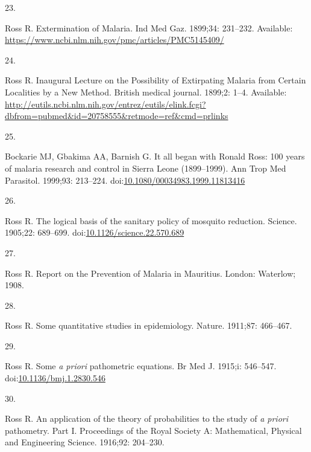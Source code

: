 \documentclass[
]{book}
\newlength{\cslhangindent}
\newlength{\csllabelwidth}
\newlength{\cslentryspacingunit} %
\newenvironment{CSLReferences}[2] %
 {%
  \setlength{\parindent}{0pt}
  \ifodd #1
  \let\oldpar\par
  \def\par{\hangindent=\cslhangindent\oldpar}
  \fi
  \setlength{\parskip}{#2\cslentryspacingunit}
 }%
 {}
\newcommand{\CSLLeftMargin}[1]{\parbox[t]{\csllabelwidth}{#1}}
\newcommand{\CSLRightInline}[1]{\parbox[t]{\linewidth - \csllabelwidth}{#1}\break}
\begin{document}
\begin{CSLReferences}{0}{0}
\leavevmode{}%
\CSLLeftMargin{23. }%
\CSLRightInline{Ross R. Extermination of {Malaria}. Ind Med Gaz. 1899;34: 231--232. Available: \url{https://www.ncbi.nlm.nih.gov/pmc/articles/PMC5145409/}}

\leavevmode{}%
\CSLLeftMargin{24. }%
\CSLRightInline{Ross R. Inaugural {Lecture} on the {Possibility} of {Extirpating} {Malaria} from {Certain} {Localities} by a {New} {Method}. British medical journal. 1899;2: 1--4. Available: \url{http://eutils.ncbi.nlm.nih.gov/entrez/eutils/elink.fcgi?dbfrom=pubmed\&id=20758555\&retmode=ref\&cmd=prlinks}}

\leavevmode{}%
\CSLLeftMargin{25. }%
\CSLRightInline{Bockarie MJ, Gbakima AA, Barnish G. It all began with {Ronald} {Ross}: 100 years of malaria research and control in {Sierra} {Leone} (1899--1999). Ann Trop Med Parasitol. 1999;93: 213--224. doi:\href{https://doi.org/10.1080/00034983.1999.11813416}{10.1080/00034983.1999.11813416}}

\leavevmode{}%
\CSLLeftMargin{26. }%
\CSLRightInline{Ross R. The logical basis of the sanitary policy of mosquito reduction. Science. 1905;22: 689--699. doi:\href{https://doi.org/10.1126/science.22.570.689}{10.1126/science.22.570.689}}

\leavevmode{}%
\CSLLeftMargin{27. }%
\CSLRightInline{Ross R. Report on the {Prevention} of {Malaria} in {Mauritius}. London: Waterlow; 1908. }

\leavevmode{}%
\CSLLeftMargin{28. }%
\CSLRightInline{Ross R. Some quantitative studies in epidemiology. Nature. 1911;87: 466--467. }

\leavevmode{}%
\CSLLeftMargin{29. }%
\CSLRightInline{Ross R. Some \emph{a priori} pathometric equations. Br Med J. 1915;i: 546--547. doi:\href{https://doi.org/10.1136/bmj.1.2830.546}{10.1136/bmj.1.2830.546}}

\leavevmode{}%
\CSLLeftMargin{30. }%
\CSLRightInline{Ross R. An application of the theory of probabilities to the study of \emph{a priori} pathometry. {Part} {I}. Proceedings of the Royal Society A: Mathematical, Physical and Engineering Science. 1916;92: 204--230. }


\end{CSLReferences}
\end{document}
